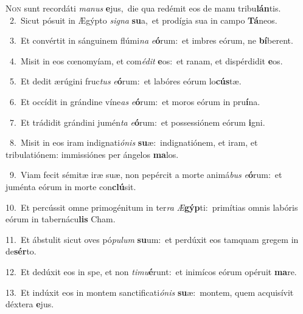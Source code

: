 \lettrine{\initial\textcolor{\initialcolor}{N}}{on} sunt recordáti \textit{ma}\-\textit{nus} \textbf{e}\-jus,~\star die qua redémit eos de manu tribu\-\textbf{lán}\-tis.\\
{\numbfont\textcolor{\numbcolor}{~2.}}~Sicut pósuit in Ægýpto \textit{si}\-\textit{gna} \textbf{su}\-a,~\star et prodígia sua in campo \textbf{Tá}\-neos.\par
{\numbfont\textcolor{\numbcolor}{~3.}}~Et convértit in sánguinem flúmi\textit{na} \textit{e}\-\textbf{ó}rum:~\star et imbres eórum, ne \textbf{bí}\-berent.\par
{\numbfont\textcolor{\numbcolor}{~4.}}~Misit in eos cœnomyíam, et com\-\textit{é}\-\textit{dit} \textbf{e}\-os:~\star et ranam, et dispérdidit \textbf{e}\-os.\par
{\numbfont\textcolor{\numbcolor}{~5.}}~Et dedit ærúgini fruc\textit{tus} \textit{e}\-\textbf{ó}rum:~\star et labóres eórum lo\-\textbf{cús}\-tæ.\par
{\numbfont\textcolor{\numbcolor}{~6.}}~Et occídit in grándine víne\textit{as} \textit{e}\-\textbf{ó}rum:~\star et moros eórum in pru\-\textbf{í}\-na.\par
{\numbfont\textcolor{\numbcolor}{~7.}}~Et trádidit grándini jumén\textit{ta} \textit{e}\-\textbf{ó}rum:~\star et possessiónem eórum \textbf{i}\-gni.\par
{\numbfont\textcolor{\numbcolor}{~8.}}~Misit in eos iram indignati\-\textit{ó}\-\textit{nis} \textbf{su}\-æ:~\star indignatiónem, et iram, et tribulatiónem: immissiónes per ángelos \textbf{ma}\-los.\par
{\numbfont\textcolor{\numbcolor}{~9.}}~Viam fecit sémitæ iræ suæ, non pepércit a morte animá\textit{bus} \textit{e}\-\textbf{ó}rum:~\star et juménta eórum in morte con\-\textbf{clú}\-sit.\par
{\numbfont\textcolor{\numbcolor}{10.}}~Et percússit omne primogénitum in ter\textit{ra} \textit{Æ}\-\textbf{gýp}ti:~\star primítias omnis labóris eórum in tabernácu\textbf{lis} Cham.\par
{\numbfont\textcolor{\numbcolor}{11.}}~Et ábstulit sicut oves pó\-\textit{pu}\-\textit{lum} \textbf{su}\-um:~\star et perdúxit eos tamquam gregem in de\-\textbf{sér}\-to.\par
{\numbfont\textcolor{\numbcolor}{12.}}~Et dedúxit eos in spe, et non \textit{ti}\-\textit{mu}\textbf{é}runt:~\star et inimícos eórum opéruit \textbf{ma}\-re.\par
{\numbfont\textcolor{\numbcolor}{13.}}~Et indúxit eos in montem sanctificati\-\textit{ó}\-\textit{nis} \textbf{su}\-æ:~\star montem, quem acquisívit déxtera \textbf{e}\-jus.\par
